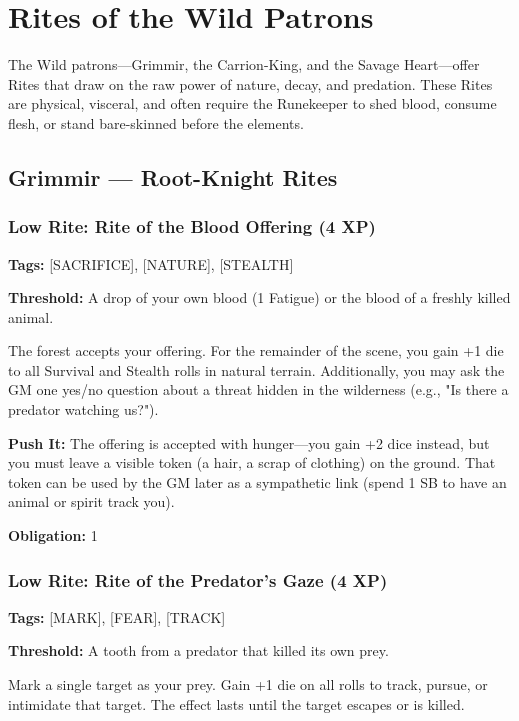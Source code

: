 \section{Rites of the Wild Patrons}

The Wild patrons—Grimmir, the Carrion-King, and the Savage Heart—offer Rites that draw on the raw power of nature, decay, and predation. These Rites are physical, visceral, and often require the Runekeeper to shed blood, consume flesh, or stand bare-skinned before the elements.

\subsection{Grimmir — Root-Knight Rites}

\subsubsection{Low Rite: Rite of the Blood Offering (4 XP)}

\textbf{Tags:} [SACRIFICE], [NATURE], [STEALTH]

\textbf{Threshold:} A drop of your own blood (1 Fatigue) or the blood of a freshly killed animal.

The forest accepts your offering. For the remainder of the scene, you gain +1 die to all Survival and Stealth rolls in natural terrain. Additionally, you may ask the GM one yes/no question about a threat hidden in the wilderness (e.g., "Is there a predator watching us?").

\textbf{Push It:} The offering is accepted with hunger—you gain +2 dice instead, but you must leave a visible token (a hair, a scrap of clothing) on the ground. That token can be used by the GM later as a sympathetic link (spend 1 SB to have an animal or spirit track you).

\textbf{Obligation:} 1

\subsubsection{Low Rite: Rite of the Predator's Gaze (4 XP)}

\textbf{Tags:} [MARK], [FEAR], [TRACK]

\textbf{Threshold:} A tooth from a predator that killed its own prey.

Mark a single target as your prey. Gain +1 die on all rolls to track, pursue, or intimidate that target. The effect lasts until the target escapes or is killed.

